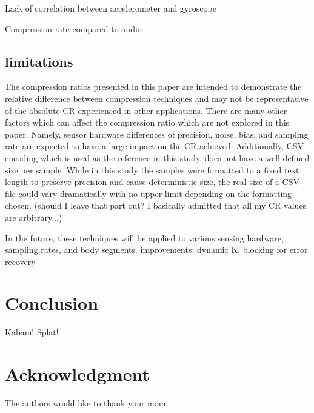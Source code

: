 \documentclass[journal]{IEEEtran}
\begin{document}
Lack of correlation between accelerometer and gyroscope

Compression rate compared to audio

\subsection{limitations}

The compression ratios presented in this paper are intended to demonstrate the relative difference between compression techniques and may not be representative of the absolute CR experienced in other applications. There are many other factors which can affect the compression ratio which are not explored in this paper. Namely, sensor hardware differences of precision, noise, bias, and sampling rate are expected to have a large impact on the CR achieved. Additionally, CSV encoding which is used as the reference in this study, does not have a well defined size per sample. While in this study the samples were formatted to a fixed text length to preserve precision and cause deterministic size, the real size of a CSV file could vary dramatically with no upper limit depending on the formatting chosen. (should I leave that part out? I basically admitted that all my CR values are arbitrary...)

In the future, these techniques will be applied to various sensing hardware, sampling rates, and body segments.
improvements: dynamic K, blocking for error recovery

\section{Conclusion}
Kabam! Splat!


\section*{Acknowledgment}

The authors would like to thank your mom.

\end{document}
